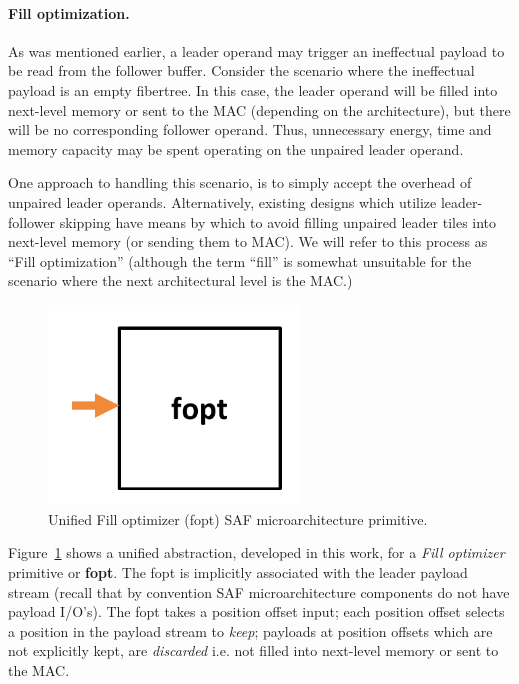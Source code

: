 \paragraph{Fill optimization.} As was mentioned earlier, a leader operand may trigger an ineffectual payload to be read from the follower buffer. Consider the scenario where the ineffectual payload is an empty fibertree. In this case, the leader operand will be filled into next-level memory or sent to the MAC (depending on the architecture), but there will be no corresponding follower operand. Thus, unnecessary energy, time and memory capacity may be spent operating on the unpaired leader operand.

One approach to handling this scenario, is to simply accept the overhead of unpaired leader operands. Alternatively, existing designs which utilize leader-follower skipping\cite{eyerissv2}\cite{gamma} have means by which to avoid filling unpaired leader tiles into next-level memory (or sending them to MAC). We will refer to this process as ``Fill optimization'' (although the term ``fill'' is somewhat unsuitable for the scenario where the next architectural level is the MAC.)

\begin{figure}[ht]
    \centering
    \includegraphics[width=0.6\textwidth]{figures/uniform_fopt.pdf}
    \caption{Unified Fill optimizer (fopt) SAF microarchitecture primitive.}
    \label{fig:uniform_fopt}
\end{figure}

Figure~\ref{fig:uniform_fopt} shows a unified abstraction, developed in this work, for a \textit{Fill optimizer} primitive or \textbf{fopt}. The fopt is implicitly associated with the leader payload stream (recall that by convention SAF microarchitecture components do not have payload I/O's). The fopt takes a position offset input; each position offset selects a position in the payload stream to \textit{keep}; payloads at position offsets which are not explicitly kept, are \textit{discarded} i.e. not filled into next-level memory or sent to the MAC.

